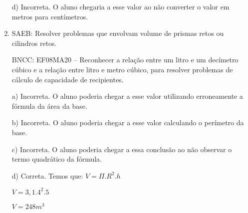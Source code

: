 \begin{enumerate}
d) Incorreta. O aluno chegaria a esse valor ao não converter o valor
em metros para centímetros.
\item SAEB: Resolver problemas que envolvam volume de prismas retos ou
cilindros retos.

BNCC: EF08MA20 -- Reconhecer a relação entre um litro e um decímetro
cúbico e a relação entre litro e metro cúbico, para resolver problemas
de cálculo de capacidade de recipientes.

a) Incorreta. O aluno poderia chegar a esse valor utilizando
erroneamente a fórmula da área da base.

b) Incorreta. O aluno poderia chegar a esse valor calculando o
perímetro da base.

c) Incorreta. O aluno poderia chegar a essa conclusão ao não
observar o termo quadrático da fórmula.

d) Correta. Temos que:
$V= \Pi. R^2 . h$

$V= 3,1 . 4^2 . 5$

$V= 248 m^3$
\end{enumerate}


